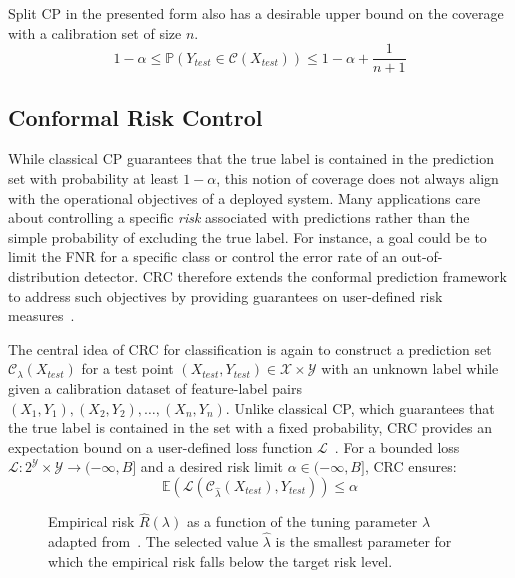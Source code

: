 Split \gls{CP} in the presented form also has a desirable upper bound on the coverage with a calibration set of size $n$.
$$1 - \alpha \le \mathbb{P}(Y_{test} \in \mathcal{C}(X_{test})) \le 1 - \alpha + \frac{1}{n + 1}$$

\subsection{Conformal Risk Control}
\label{sect:conformal_risk_control}
While classical \gls{CP} guarantees that the true label is contained in the prediction set with probability at least $1-\alpha$, this notion of coverage does not always align with the operational objectives of a deployed system. Many applications care about controlling a specific \textit{risk} associated with predictions rather than the simple probability of excluding the true label. For instance, a goal could be to limit the \gls{FNR} for a specific class or control the error rate of an out-of-distribution detector. \gls{CRC} therefore extends the conformal prediction framework to address such objectives by providing guarantees on user-defined risk measures~\cite{Angelopoulus-ConformalRiskControl-2025, Angelopoulos-ConformalPredictionTheory-2025}.

The central idea of \gls{CRC} for classification is again to construct a prediction set $\mathcal{C}_\lambda(X_{test})$ for a test point $(X_{test}, Y_{test}) \in \mathcal{X} \times \mathcal{Y}$ with an unknown label while given a calibration dataset of feature-label pairs $(X_1, Y_1), (X_2, Y_2), \dots, (X_n, Y_n)$. Unlike classical \gls{CP}, which guarantees that the true label is contained in the set with a fixed probability, \gls{CRC} provides an expectation bound on a user-defined loss function $\mathcal{L}$~\cite{Angelopoulus-ConformalRiskControl-2025}. For a bounded loss $\mathcal{L}: 2^{\mathcal{Y}} \times \mathcal{Y} \rightarrow (-\infty, B]$ and a desired risk limit $\alpha \in (-\infty, B]$, \gls{CRC} ensures:
$$\mathbb{E}(\mathcal{L}(\mathcal{C}_{\widehat\lambda}(X_{test}), Y_{test})) \le \alpha$$

\begin{figure}[t]
    \centering
    
    \caption{Empirical risk $\hat{R}(\lambda)$ as a function of the tuning parameter $\lambda$ adapted from~\cite{Angelopoulos-ConformalPredictionTheory-2025}. The selected value $\hat{\lambda}$ is the smallest parameter for which the empirical risk falls below the target risk level.}
    \label{fig:conformal_risk_control}
\end{figure}

